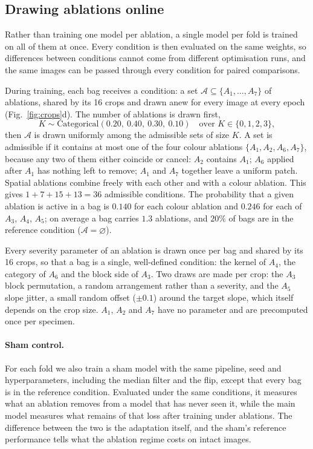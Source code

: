 \subsection{Drawing ablations online}
\label{sec:online}

Rather than training one model per ablation, a single model per fold is
trained on all of them at once. Every condition is then evaluated on the same
weights, so differences between conditions cannot come from different
optimisation runs, and the same images can be passed through every condition
for paired comparisons.

During training, each bag receives a condition: a set
$\mathcal{A} \subseteq \{A_1, \dots, A_7\}$ of ablations, shared by its 16
crops and drawn anew for every image at every epoch
(Fig.~\ref{fig:crops}d). The number of ablations
is drawn first,
\begin{equation}
  K \sim \mathrm{Categorical}(0.20,\ 0.40,\ 0.30,\ 0.10) \quad \text{over } K \in \{0, 1, 2, 3\},
\end{equation}
then $\mathcal{A}$ is drawn uniformly among the admissible sets of size $K$.
A set is admissible if it contains at most one of the four colour ablations
$\{A_1, A_2, A_6, A_7\}$, because any two of them either coincide or cancel:
$A_2$ contains $A_1$; $A_6$ applied after $A_1$ has nothing left to remove;
$A_1$ and $A_7$ together leave a uniform patch. Spatial ablations combine
freely with each other and with a colour ablation. This gives
$1 + 7 + 15 + 13 = 36$ admissible conditions. The probability that a given
ablation is active in a bag is $0.140$ for each colour ablation and $0.246$ for
each of $A_3$, $A_4$, $A_5$; on average a bag carries $1.3$ ablations, and $20\%$
of bags are in the reference condition ($\mathcal{A} = \varnothing$).

Every severity parameter of an ablation is drawn once per bag and shared by its 16
crops, so that a bag is a single, well-defined condition: the kernel of $A_4$,
the category of $A_6$ and the block side of $A_3$. Two draws are made per crop:
the $A_3$ block permutation, a random arrangement rather than a severity, and the
$A_5$ slope jitter, a small random offset ($\pm 0.1$) around the target slope,
which itself depends on the crop size.
$A_1$, $A_2$ and $A_7$ have no parameter and are precomputed once per specimen.

\paragraph{Sham control.}
For each fold we also train a sham model with the same pipeline, seed and
hyperparameters, including the median filter and the flip, except that every
bag is in the reference condition. Evaluated under the same conditions, it
measures what an ablation removes from a model that has never seen it, while
the main model measures what remains of that loss after training under
ablations. The difference between the two is the adaptation itself, and the
sham's reference performance tells what the ablation regime costs on intact
images.

